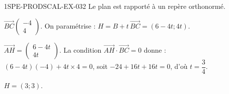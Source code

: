 \begin{corrige}{1SPE-PRODSCAL-EX-032}
Le plan est rapporté à un repère orthonormé.

$\overrightarrow{BC}\begin{pmatrix} -4 \\ 4 \end{pmatrix}$. On paramétrise : $H = B + t\,\overrightarrow{BC} = (6 - 4t; 4t)$.

$\overrightarrow{AH} = \begin{pmatrix} 6-4t \\ 4t \end{pmatrix}$. La condition $\overrightarrow{AH} \cdot \overrightarrow{BC} = 0$ donne :
$(6-4t)(-4) + 4t \times 4 = 0$, soit $-24 + 16t + 16t = 0$, d'où $t = \dfrac{3}{4}$.

$H = \left(3; 3\right)$.
\end{corrige}
